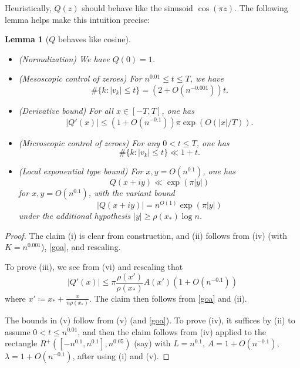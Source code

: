 \documentclass[12pt]{amsart}
\newtheorem{lemma}[theorem]{Lemma}
\begin{document}
Heuristically, $Q(z)$ should behave like the sinusoid $\cos(\pi z)$.  The following lemma helps make this intuition precise:

\begin{lemma}[$Q$ behaves like cosine]\label{Q-bound}\
\begin{itemize}
\item[(i)] (Normalization) We have $Q(0)=1$.
\item[(ii)] (Mesoscopic control of zeroes) For $n^{0.01} \leq t \leq T$, we have
$$ \# \{ k: |v_k| \leq t \} = (2 + O(n^{-0.001})) t.$$
\item[(iii)]  (Derivative bound)  For all $x \in [-T,T]$, one has
$$ |Q'(x)| \leq (1 + O(n^{-0.1})) \pi \exp( O( |x|/T )).$$
\item[(iv)]  (Microscopic control of zeroes) For any $0 < t \leq T$, one has
\begin{equation}\label{fz}
    \# \{ k: |v_k| \leq t \} \ll 1 + t.
\end{equation}
\item[(v)] (Local exponential type bound) For $x, y = O(n^{0.1})$, one has
\begin{equation}\label{expt}
Q(x+iy) \ll \exp( \pi |y| )
\end{equation}
for $x, y = O(n^{0.1})$, with the variant bound
\begin{equation}\label{exp-var}
|Q(x+iy)| = n^{O(1)} \exp( \pi |y| )
\end{equation}
under the additional hypothesis $|y| \geq \rho(x_*) \log n$.
\end{itemize}
\end{lemma}

\begin{proof}  The claim (i) is clear from construction, and (ii) follows from (iv) (with $K = n^{0.001}$), \eqref{goa}, and rescaling.

To prove (iii), we see from (vi) and rescaling that
$$ |Q'(x)| \leq \pi \frac{\rho(x')}{\rho(x_*)} A(x')
 (1 + O(n^{-0.1}))$$
where $x' \coloneqq x_* + \frac{x}{n \rho(x_*)}$.  The claim then follows from \eqref{goa} and (ii).

The bounds in (v) follow from (v) (and \eqref{goa}).  To prove (iv), it suffices by (ii) to assume $0 < t \leq n^{0.01}$, and then the claim follows from (iv) applied to the rectangle $R^+([-n^{0.1}, n^{0.1}], n^{0.05})$ (say) with $L = n^{0.1}$, $A = 1 + O(n^{-0.1})$, $\lambda = 1 + O(n^{-0.1})$, after using (i) and (v).
\end{proof}
\end{document}
